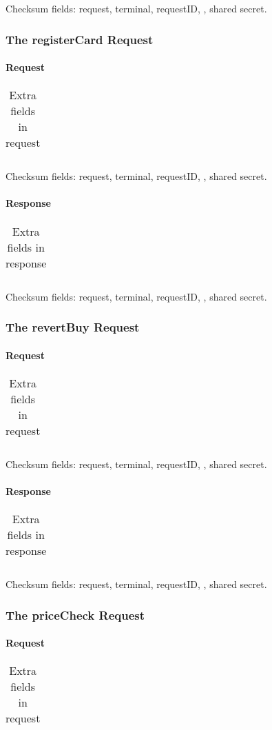 \documentclass[a4paper,11pt]{article}
\newcommand{\code}[1]
   {\textsf{\mbox{#1}}}
\newcommand{\rightcellwidth}{25em}
\newcommand{\reqsection}[1]
    {\subsubsection{The \code{#1} Request}}
\newcommand{\partsection}[1]
           {\paragraph{#1}}
\begin{document}
Checksum fields: request, terminal, requestID, , shared secret.


\reqsection{registerCard}

\partsection{Request}
\begin{table}[!ht]
  \begin{tabular}{|l|p{\rightcellwidth}|}
    \hline
       \\\hline
  \end{tabular} 
  \caption{Extra fields in \code{} request}
\end{table}

Checksum fields: request, terminal, requestID, , shared secret.

\partsection{Response}
\begin{table}[!ht]
  \begin{tabular}{|l|p{\rightcellwidth}|}
    \hline
       \\\hline
  \end{tabular} 
  \caption{Extra fields in \code{} response}
\end{table}

Checksum fields: request, terminal, requestID, , shared secret.


\reqsection{revertBuy}

\partsection{Request}
\begin{table}[!ht]
  \begin{tabular}{|l|p{\rightcellwidth}|}
    \hline
       \\\hline
  \end{tabular} 
  \caption{Extra fields in \code{} request}
\end{table}

Checksum fields: request, terminal, requestID, , shared secret.

\partsection{Response}
\begin{table}[!ht]
  \begin{tabular}{|l|p{\rightcellwidth}|}
    \hline
       \\\hline
  \end{tabular} 
  \caption{Extra fields in \code{} response}
\end{table}

Checksum fields: request, terminal, requestID, , shared secret.


\reqsection{priceCheck}

\partsection{Request}
\begin{table}[!ht]
  \begin{tabular}{|l|p{\rightcellwidth}|}
    \hline
       \\\hline
  \end{tabular} 
  \caption{Extra fields in \code{} request}
\end{table}
\end{document}
